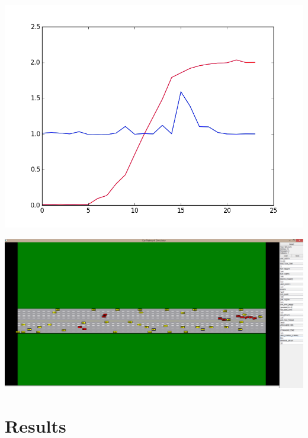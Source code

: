 \documentclass[a0,landscape]{a0poster}
\begin{document}
\begin{multicols}{4}
\includegraphics{rand_plot}

\includegraphics[width=0.9\linewidth]{car_sim}



\section*{Results}


\end{multicols}
\end{document}
